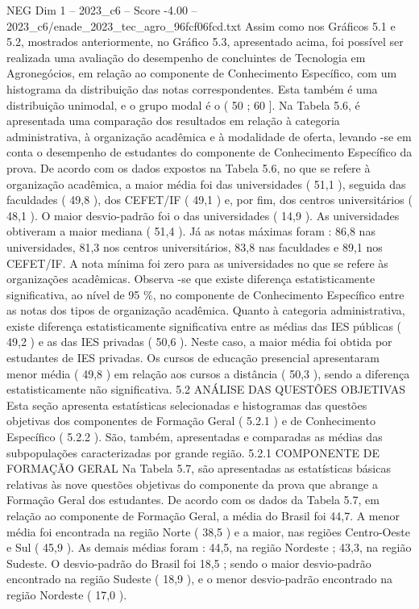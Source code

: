 \begin{textsample}{NEG Dim 1 – 2023\_c6 – Score -4.00 – 2023\_c6/enade\_2023\_tec\_agro\_96fcf06fcd.txt}
Assim como nos Gráficos 5.1 e 5.2, mostrados anteriormente, no Gráfico 5.3, apresentado acima, foi possível ser realizada uma avaliação do desempenho de concluintes de Tecnologia em Agronegócios, em relação ao componente de Conhecimento Específico, com um histograma da distribuição das notas correspondentes.
Esta também é uma distribuição unimodal, e o grupo modal é o ( 50 ; 60 ].
Na Tabela 5.6, é apresentada uma comparação dos resultados em relação à categoria administrativa, à organização acadêmica e à modalidade de oferta, levando -se em conta o desempenho de estudantes do componente de Conhecimento Específico da prova.
De acordo com os dados expostos na Tabela 5.6, no que se refere à organização acadêmica, a maior média foi das universidades ( 51,1 ), seguida das faculdades ( 49,8 ), dos CEFET/IF ( 49,1 ) e, por fim, dos centros universitários ( 48,1 ).
O maior desvio-padrão foi o das universidades ( 14,9 ).
As universidades obtiveram a maior mediana ( 51,4 ).
Já as notas máximas foram : 86,8 nas universidades, 81,3 nos centros universitários, 83,8 nas faculdades e 89,1 nos CEFET/IF.
A nota mínima foi zero para as universidades no que se refere às organizações acadêmicas.
Observa -se que existe diferença estatisticamente significativa, ao nível de 95 \%, no componente de Conhecimento Específico entre as notas dos tipos de organização acadêmica.
Quanto à categoria administrativa, existe diferença estatisticamente significativa entre as médias das IES públicas ( 49,2 ) e as das IES privadas ( 50,6 ).
Neste caso, a maior média foi obtida por estudantes de IES privadas.
Os cursos de educação presencial apresentaram menor média ( 49,8 ) em relação aos cursos a distância ( 50,3 ), sendo a diferença estatisticamente não significativa. 5.2 ANÁLISE DAS QUESTÕES OBJETIVAS Esta seção apresenta estatísticas selecionadas e histogramas das questões objetivas dos componentes de Formação Geral ( 5.2.1 ) e de Conhecimento Específico ( 5.2.2 ).
São, também, apresentadas e comparadas as médias das subpopulações caracterizadas por grande região. 5.2.1 COMPONENTE DE FORMAÇÃO GERAL Na Tabela 5.7, são apresentadas as estatísticas básicas relativas às nove questões objetivas do componente da prova que abrange a Formação Geral dos estudantes.
De acordo com os dados da Tabela 5.7, em relação ao componente de Formação Geral, a média do Brasil foi 44,7.
A menor média foi encontrada na região Norte ( 38,5 ) e a maior, nas regiões Centro-Oeste e Sul ( 45,9 ).
As demais médias foram : 44,5, na região Nordeste ; 43,3, na região Sudeste.
O desvio-padrão do Brasil foi 18,5 ; sendo o maior desvio-padrão encontrado na região Sudeste ( 18,9 ), e o menor desvio-padrão encontrado na região Nordeste ( 17,0 ).

\end{textsample}
